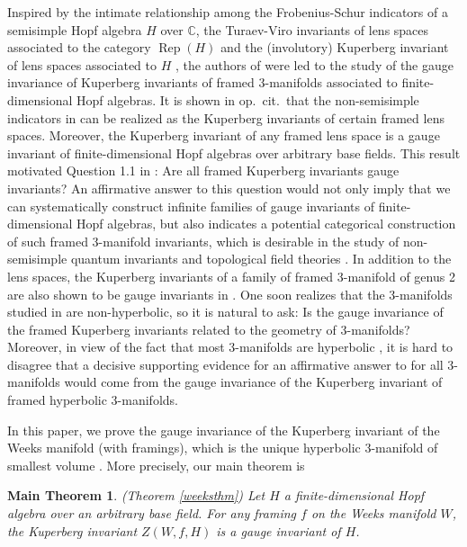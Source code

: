 \documentclass[12pt]{amsart}
\newtheorem*{mainthm}{Main Theorem}
\begin{document}
Inspired by the intimate relationship among the Frobenius-Schur indicators of a semisimple Hopf algebra $H$ over $\mathbb{C}$, the Turaev-Viro invariants of lens spaces associated to the category $\operatorname{Rep}(H)$ \cite{TV92} and the (involutory) Kuperberg invariant of lens spaces associated to $H$ \cite{Kup91,BW95}, the authors of \cite{CNW25} were led to the study of the gauge invariance of Kuperberg invariants of framed 3-manifolds associated to finite-dimensional Hopf algebras. It is shown in op.~cit.~that the non-semisimple indicators in \cite{KMN12} can be realized as the Kuperberg invariants of certain framed lens spaces. Moreover, the Kuperberg invariant of any framed lens space is a gauge invariant of finite-dimensional Hopf algebras over arbitrary base fields. This result motivated Question 1.1 in \cite{CNW25}: Are all framed Kuperberg invariants gauge invariants? An affirmative answer to this question would not only imply that we can systematically construct infinite families of gauge invariants of finite-dimensional Hopf algebras, but also indicates a potential categorical construction of such framed 3-manifold invariants, which is desirable in the study of non-semisimple quantum invariants and topological field theories \cite{Lyu95I,CGPT20-kup, DGGPR22, MSWY23}. In addition to the lens spaces, the Kuperberg invariants of a family of framed 3-manifold of genus 2 are also shown to be gauge invariants in \cite{CNW25}. One soon realizes that the 3-manifolds studied in \cite{CNW25} are non-hyperbolic, so it is natural to ask: Is the gauge invariance of the framed Kuperberg invariants related to the geometry of 3-manifolds? Moreover, in view of the fact that most 3-manifolds are hyperbolic \cite{Thur82}, it is hard to disagree that a decisive supporting evidence for an affirmative answer to \cite[Question 1.1]{CNW25} for all 3-manifolds would come from the gauge invariance of the Kuperberg invariant of  framed hyperbolic 3-manifolds.

In this paper, we prove the gauge invariance of the Kuperberg invariant of the Weeks manifold (with framings), which is the unique hyperbolic 3-manifold of smallest volume \cite{GMM09}. More precisely, our main theorem is 

\begin{mainthm}(Theorem \ref{weeksthm})
Let $H$ a finite-dimensional Hopf algebra over an arbitrary base field. For any framing $f$ on the Weeks manifold $W$, the Kuperberg invariant $Z(W, f, H)$ is a gauge invariant of $H$.
\end{mainthm}
\end{document}

